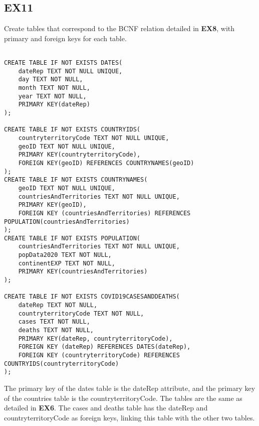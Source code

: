\documentclass{article}
\begin{document}
\subsection{EX11}
Create tables that correspond to the BCNF relation detailed in \textbf{EX8}, with primary and foreign keys for each table. 
\begin{verbatim}

CREATE TABLE IF NOT EXISTS DATES(
    dateRep TEXT NOT NULL UNIQUE,
    day TEXT NOT NULL,
    month TEXT NOT NULL,
    year TEXT NOT NULL,
    PRIMARY KEY(dateRep)
);

CREATE TABLE IF NOT EXISTS COUNTRYIDS(
    countryterritoryCode TEXT NOT NULL UNIQUE,
    geoID TEXT NOT NULL UNIQUE,
    PRIMARY KEY(countryterritoryCode),
    FOREIGN KEY(geoID) REFERENCES COUNTRYNAMES(geoID)
);
CREATE TABLE IF NOT EXISTS COUNTRYNAMES(
    geoID TEXT NOT NULL UNIQUE,
    countriesAndTerritories TEXT NOT NULL UNIQUE,
    PRIMARY KEY(geoID),
    FOREIGN KEY (countriesAndTerritories) REFERENCES POPULATION(countriesAndTerritories)
);
CREATE TABLE IF NOT EXISTS POPULATION(
    countriesAndTerritories TEXT NOT NULL UNIQUE,
    popData2020 TEXT NOT NULL,
    continentEXP TEXT NOT NULL,
    PRIMARY KEY(countriesAndTerritories)
);

CREATE TABLE IF NOT EXISTS COVID19CASESANDDEATHS(
    dateRep TEXT NOT NULL,
    countryterritoryCode TEXT NOT NULL,
    cases TEXT NOT NULL,
    deaths TEXT NOT NULL,
    PRIMARY KEY(dateRep, countryterritoryCode),
    FOREIGN KEY (dateRep) REFERENCES DATES(dateRep),
    FOREIGN KEY (countryterritoryCode) REFERENCES COUNTRYIDS(countryterritoryCode)
);
\end{verbatim}

The primary key of the dates table is the dateRep attribute, and the primary key of the countries table is the countryterritoryCode. The tables are the same as detailed in \textbf{EX6}. 
The cases and deaths table has the dateRep and countryterritoryCode as foreign keys, linking this table with the other two tables. 
\end{document}
